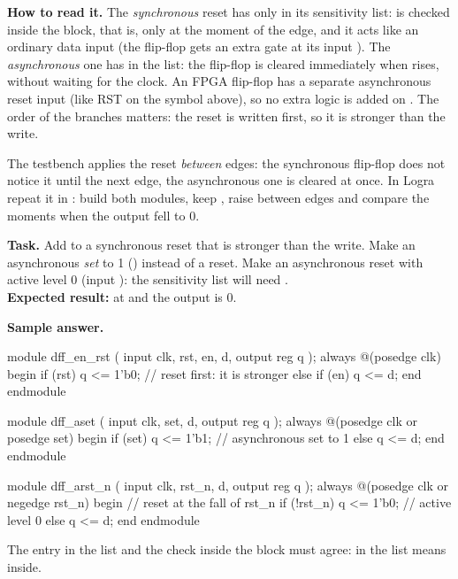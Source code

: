 \textbf{How to read it.} The \emph{synchronous} reset has only 
in its sensitivity list:  is checked inside the block, that is, only at
the moment of the edge, and it acts like an ordinary data input (the flip-flop
gets an extra gate at its input ). The \emph{asynchronous} one has
 in the list: the flip-flop is cleared immediately when
 rises, without waiting for the clock. An FPGA flip-flop has a
separate asynchronous reset input (like RST on the symbol above), so no extra
logic is added on . The order of the branches
 matters: the reset is written first, so it
is stronger than the write.


The testbench applies the reset \emph{between} edges: the synchronous
flip-flop does not notice it until the next edge, the asynchronous one is
cleared at once. In Logra repeat it in : build both modules,
keep , raise  between edges and compare the moments when the
output fell to 0.

\begin{diybox}
\textbf{Task.}  Add to  a synchronous reset that is
stronger than the write.  Make an asynchronous \emph{set} to 1
() instead of a reset.  Make an asynchronous reset with
active level 0 (input ): the sensitivity list will need
.\\
\textbf{Expected result:} at  and  the output is 0.
\end{diybox}

\textbf{Sample answer.}
\begin{vcode}
module dff_en_rst (
    input      clk, rst, en, d,
    output reg q
);
    always @(posedge clk) begin
        if (rst)     q <= 1'b0;    // reset first: it is stronger
        else if (en) q <= d;
    end
endmodule

module dff_aset (
    input      clk, set, d,
    output reg q
);
    always @(posedge clk or posedge set) begin
        if (set) q <= 1'b1;        // asynchronous set to 1
        else     q <= d;
    end
endmodule

module dff_arst_n (
    input      clk, rst_n, d,
    output reg q
);
    always @(posedge clk or negedge rst_n) begin   // reset at the fall of rst_n
        if (!rst_n) q <= 1'b0;                      // active level 0
        else        q <= d;
    end
endmodule
\end{vcode}
The entry in the list and the check inside the block must agree:  in the list means  inside.

